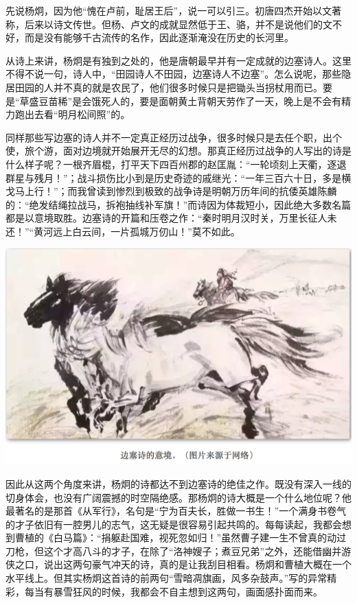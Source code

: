 \documentclass[
]{book}
\begin{document}
先说杨炯，因为他``愧在卢前，耻居王后''，说一可以引三。初唐四杰开始以文著称，后来以诗文传世。但杨、卢文的成就显然低于王、骆，并不是说他们的文不好，而是没有能够千古流传的名作，因此逐渐淹没在历史的长河里。

从诗上来讲，杨炯是有独到之处的，他是唐朝最早并有一定成就的边塞诗人。这里不得不说一句，诗人中，``田园诗人不田园，边塞诗人不边塞''。怎么说呢，那些隐居田园的人并不真的就是农民了，他们很多时候只是把锄头当拐杖用而已。要是``草盛豆苗稀''是会饿死人的，要是面朝黄土背朝天劳作了一天，晚上是不会有精力跑出去看``明月松间照''的。

同样那些写边塞的诗人并不一定真正经历过战争，很多时候只是去任个职，出个使，旅个游，面对边境就开始展开无尽的幻想。那真正经历过战争的人写出的诗是什么样子呢？一根齐眉棍，打平天下四百州郡的赵匡胤：``一轮顷刻上天衢，逐退群星与残月！''；战斗损伤比小到是历史奇迹的戚继光：``一年三百六十日，多是横戈马上行！''；而我曾读到惨烈到极致的战争诗是明朝万历年间的抗倭英雄陈麟的：``绝发结绳拉战马，拆袍抽线补军旗！''而诗因为体裁短小，因此绝大多数名篇都是以意境取胜。边塞诗的开篇和压卷之作：``秦时明月汉时关，万里长征人未还！''``黄河远上白云间，一片孤城万仞山！''莫不如此。

\includegraphics[width=8.33in]{images/ctsj1}

因此从这两个角度来讲，杨炯的诗都达不到边塞诗的绝佳之作。既没有深入一线的切身体会，也没有广阔震撼的时空隔绝感。那杨炯的诗大概是一个什么地位呢？他最著名的是那首《从军行》，名句是``宁为百夫长，胜做一书生！''一个满身书卷气的才子依旧有一腔男儿的志气，这无疑是很容易引起共鸣的。每每读起，我都会想到曹植的《白马篇》：``捐躯赴国难，视死忽如归！''虽然曹子建一生不曾真的动过刀枪，但这个才高八斗的才子，在除了``洛神嫂子；煮豆兄弟''之外，还能借幽并游侠之口，说出这两句豪气冲天的诗，真的是让我刮目相看。杨炯和曹植大概在一个水平线上。但其实杨炯这首诗的前两句``雪暗凋旗画，风多杂鼓声。''写的异常精彩，每当有暴雪狂风的时候，我都会不自主想到这两句，画面感扑面而来。
\end{document}
